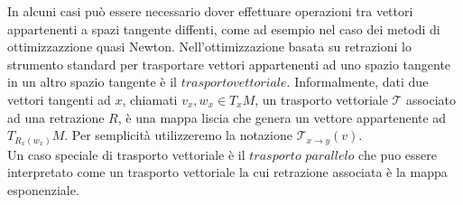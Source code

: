 \documentclass[a4paper, 12pt]{article}
\begin{document}
In alcuni casi può essere necessario dover effettuare operazioni tra vettori appartenenti a spazi tangente diffenti, come ad esempio nel caso dei metodi di ottimizzazzione quasi Newton. Nell'ottimizzazione basata su retrazioni lo strumento standard per trasportare vettori appartenenti ad uno spazio tangente in un altro spazio tangente è il $trasporto vettoriale$. Informalmente, dati due vettori tangenti ad $x$, chiamati $v_x, w_x \in T_xM$, un trasporto vettoriale $\mathcal{T}$ associato ad una retrazione $R$, è una mappa liscia che genera un vettore appartenente ad $T_{R_x(w_x)}M$. Per semplicità utilizzeremo la notazione $\mathcal{T}_{x \to y}(v)$.\\
Un caso speciale di trasporto vettoriale è il $trasporto$ $parallelo$ che puo essere interpretato come un trasporto vettoriale la cui retrazione associata è la mappa esponenziale.
\end{document}

